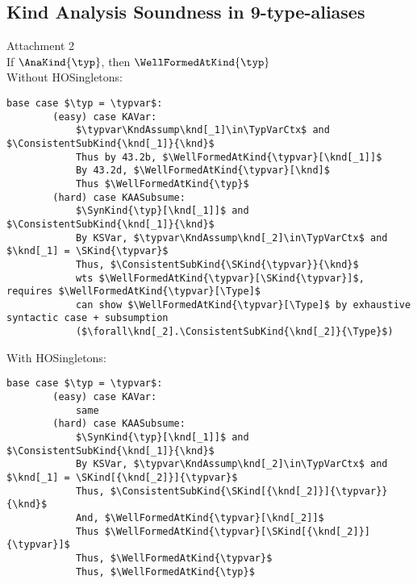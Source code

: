\documentclass[12pt,fleqn]{article}
\renewcommand*{\TypVarCtx}{\Phi}
\begin{document}
    \subsection*{Kind Analysis Soundness in 9-type-aliases}
    Attachment 2 \\
    If $\AnaKind{\typ}$, then $\WellFormedAtKind{\typ}$ \\
    Without HOSingletons: \\
    \begin{lstlisting}[mathescape=true]
    base case $\typ = \typvar$:
        (easy) case KAVar:
            $\typvar\KndAssump\knd[_1]\in\TypVarCtx$ and $\ConsistentSubKind{\knd[_1]}{\knd}$
            Thus by 43.2b, $\WellFormedAtKind{\typvar}[\knd[_1]]$
            By 43.2d, $\WellFormedAtKind{\typvar}[\knd]$
            Thus $\WellFormedAtKind{\typ}$
        (hard) case KAASubsume:
            $\SynKind{\typ}[\knd[_1]]$ and $\ConsistentSubKind{\knd[_1]}{\knd}$
            By KSVar, $\typvar\KndAssump\knd[_2]\in\TypVarCtx$ and $\knd[_1] = \SKind{\typvar}$
            Thus, $\ConsistentSubKind{\SKind{\typvar}}{\knd}$
            wts $\WellFormedAtKind{\typvar}[\SKind{\typvar}]$, requires $\WellFormedAtKind{\typvar}[\Type]$
            can show $\WellFormedAtKind{\typvar}[\Type]$ by exhaustive syntactic case + subsumption
            ($\forall\knd[_2].\ConsistentSubKind{\knd[_2]}{\Type}$)
    \end{lstlisting}
    With HOSingletons: \\
    \begin{lstlisting}[mathescape=true]
    base case $\typ = \typvar$:
        (easy) case KAVar:
            same
        (hard) case KAASubsume:
            $\SynKind{\typ}[\knd[_1]]$ and $\ConsistentSubKind{\knd[_1]}{\knd}$
            By KSVar, $\typvar\KndAssump\knd[_2]\in\TypVarCtx$ and $\knd[_1] = \SKind[{\knd[_2]}]{\typvar}$
            Thus, $\ConsistentSubKind{\SKind[{\knd[_2]}]{\typvar}}{\knd}$
            And, $\WellFormedAtKind{\typvar}[\knd[_2]]$
            Thus $\WellFormedAtKind{\typvar}[\SKind[{\knd[_2]}]{\typvar}]$
            Thus, $\WellFormedAtKind{\typvar}$
            Thus, $\WellFormedAtKind{\typ}$
    \end{lstlisting}
\end{document}
